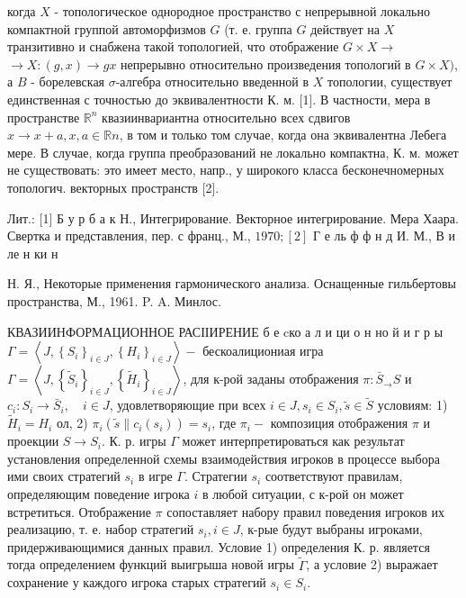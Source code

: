 \documentclass[10pt]{article}
\begin{document}
когда $X$ - топологическое однородное пространство с непрерывной локально компактной группой автоморфизмов $G$ (т. е. группа $G$ действует на $X$ транзитивно и снабжена такой топологией, что отображение $G \times X \rightarrow$ $\rightarrow X:(g, x) \rightarrow g x$ непрерывно относительно произведения топологий в $G \times X)$, а $B$ - борелевская $\sigma$-алгебра относительно введенной в $X$ топологии, существует единственная с точностью до эквивалентности К. м. [1]. В частности, мера в пространстве $\mathbb{R}^{n}$ квазиинвариантна относительно всех сдвигов $x \rightarrow x+a, x, a \in \mathbb{R} n$, в том и только том случае, когда она эквивалентна Лебега мере. В случае, когда группа преобразований не локально компактна, К. м. может не существовать: это имеет место, напр., у широкого класса бесконечномерных топологич. векторных пространств [2].



Лит.: [1] Б у р б а к Н., Интегрирование. Векторное интегрирование. Мера Хаара. Свертка и представления, пер. с франц., М., $1970 ;[2]$ Г е ль ф ф н д И. М., В и ле н ки н

Н. Я., Некоторые применения гармонического анализа. Оснащенные гильбертовы пространства, М., 1961. P. A. Минлос.



КВАЗИИНФОРМАЦИОННОЕ РАСІІИРЕНИЕ б е cко а л и ци о н но й и г р ы $\Gamma=\left\langle J,\left\{S_{i}\right\}_{i \in J},\left\{H_{i}\right\}_{i \in J}\right\rangle-$ бескоалициониая игра $\Gamma=\left\langle J,\left\{\tilde{S}_{i}\right\}_{i \in J},\left\{\tilde{H}_{i}\right\}_{i \in J}\right\rangle$, для к-рой заданы отображения $\pi: \bar{S}_{\rightarrow} S$ и $c_{i}: S_{i} \rightarrow \bar{S}_{i}, \quad i \in J$, удовлетворяющие при всех $i \in J, s_{i} \in S_{i}, \tilde{s} \in \tilde{S}$ условиям: 1) $\tilde{H}_{i}=H_{i}$ ол, 2) $\pi_{i}\left(\tilde{s} \| c_{i}\left(s_{i}\right)\right)=s_{i}$, где $\pi_{i}-$ композиция отображения $\pi$ и проекции $S \rightarrow S_{i}$. К. р. игры $\Gamma$ может интерпретироваться как результат установления определенной схемы взаимодействия игроков в процессе выбора ими своих стратегий $s_{i}$ в игре $\Gamma$. Стратегии $s_{i}$ соответствуют правилам, определяющим поведение игрока $i$ в любой ситуации, с к-рой он может встретиться. Отображение $\pi$ сопоставляет набору правил поведения игроков их реализацию, т. е. набор стратегий $s_{i}, i \in J$, к-рые будут выбраны игроками, придерживающимися данных правил. Условие 1) определения К. р. является тогда определением функций выигрыша новой игры $\tilde{\Gamma}$, а условие 2) выражает сохранение у каждого игрока старых стратегий $s_{i} \in S_{i}$.
\end{document}

